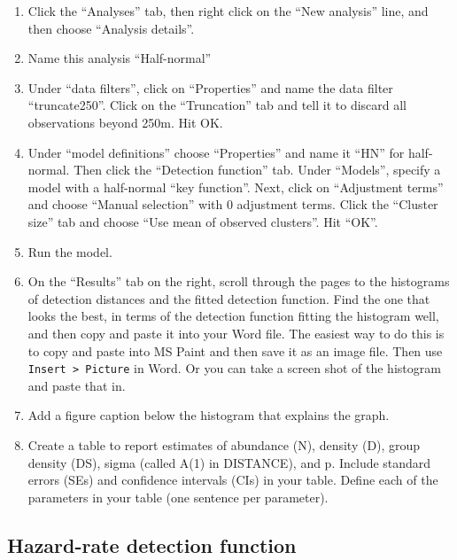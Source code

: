 \documentclass[12pt]{article}
\begin{document}
\begin{enumerate}
  \item Click the ``Analyses'' tab, then right click on the ``New 
    analysis'' line, and then choose ``Analysis details''.  
  \item Name this analysis ``Half-normal''
  \item Under ``data filters'', click on ``Properties'' and
    name the data filter ``truncate250''. Click on the ``Truncation''
    tab and tell it to discard all observations beyond 250m. Hit
    OK. 
  \item Under ``model definitions'' choose ``Properties'' and
    name it ``HN'' for half-normal. Then click the ``Detection
    function'' tab. Under ``Models'', specify a model with a
    half-normal ``key function''. Next, click on ``Adjustment terms''
    and choose ``Manual selection'' with 0 adjustment terms. Click the
    ``Cluster size'' tab and choose ``Use mean of observed
    clusters''. Hit ``OK''. 
  \item Run the model.
  \item On the ``Results'' tab on the right, scroll through the
    pages to the histograms of detection distances and the fitted
    detection function. Find the one that looks the best, in terms of
    the detection function fitting the histogram well, and then copy
    and paste it into your Word file. The easiest way to do this is to
    copy and paste into MS Paint and then save it as an image
    file. Then use \verb+Insert > Picture+ in Word.  Or you can take a
    screen shot of the histogram and paste that in. 
  \item Add a figure caption below the histogram that explains
    the graph.   
  \item Create a table to report estimates of abundance (N), density
    (D), group density (DS), sigma (called A(1) in DISTANCE), and
    p. Include standard errors (SEs) and confidence intervals (CIs) in
    your table. Define each of the parameters in your table (one sentence per parameter). 
\end{enumerate}


\subsection*{\normalsize Hazard-rate detection function}
\end{document}
